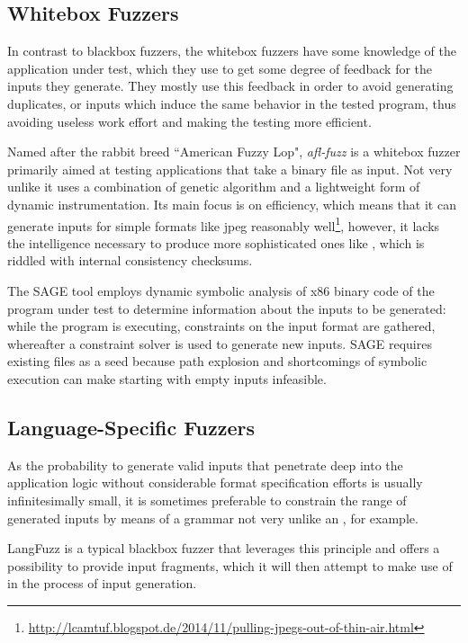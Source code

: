 \subsection{Whitebox Fuzzers}
In contrast to blackbox fuzzers, the whitebox fuzzers have some knowledge of the application under
test, which they use to get some degree of feedback for the inputs they generate. They mostly use this feedback
in order to avoid generating duplicates, or inputs which induce the same behavior in the tested program, thus
avoiding useless work effort and making the testing more efficient.

Named after the rabbit breed ``American Fuzzy Lop", \emph{afl-fuzz}\cite{afl} is a whitebox fuzzer
primarily aimed at testing applications that take a binary file as input. Not very unlike \xmlmate it uses a
combination of genetic algorithm and a lightweight form of dynamic instrumentation. Its main focus is on
efficiency, which means that it can generate inputs for simple formats like jpeg reasonably
well\footnote{\url{http://lcamtuf.blogspot.de/2014/11/pulling-jpegs-out-of-thin-air.html}}, however, it lacks
the intelligence necessary to produce more sophisticated ones like \png, which is riddled with internal
consistency checksums.

The SAGE\cite{godefroid-sage} tool employs dynamic symbolic analysis of x86 binary code of the program under
test to determine information about the inputs to be generated: while the program is executing, constraints on
the input format are gathered, whereafter a constraint solver is used to generate new inputs. SAGE requires
existing files as a seed because path explosion and shortcomings of symbolic execution can make starting with
empty inputs infeasible.

\subsection{Language-Specific Fuzzers}
As the probability to generate valid inputs that penetrate deep into the application logic without considerable
format specification efforts is usually infinitesimally small, it is sometimes preferable to constrain the
range of generated inputs by means of a grammar not very unlike an \xsd, for example.

LangFuzz\cite{holler2012} is a typical blackbox fuzzer that leverages this principle and offers a possibility
to provide input fragments, which it will then attempt to make use of in the process of input generation.

